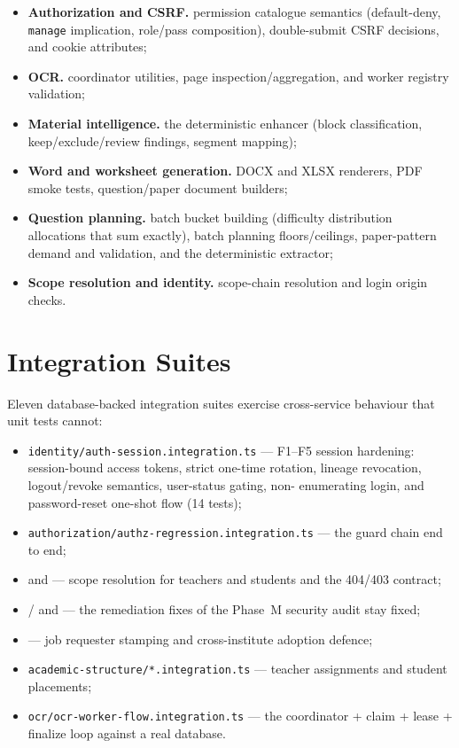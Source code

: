 \begin{itemize}
  \item \textbf{Authorization and CSRF.} permission catalogue semantics
  (default-deny, \texttt{manage} implication, role/pass composition),
  double-submit CSRF decisions, and cookie attributes;
  \item \textbf{OCR.} coordinator utilities, page inspection/aggregation, and
  worker registry validation;
  \item \begin{sloppypar}\textbf{Material intelligence.} the deterministic
  enhancer (block classification, keep/exclude/review findings, segment
  mapping);\end{sloppypar}
  \item \textbf{Word and worksheet generation.} DOCX and XLSX renderers, PDF
  smoke tests, question/paper document builders;
  \item \textbf{Question planning.} batch bucket building (difficulty
  distribution allocations that sum exactly), batch planning floors/ceilings,
  paper-pattern demand and validation, and the deterministic extractor;
  \item \textbf{Scope resolution and identity.} scope-chain resolution and
  login origin checks.
\end{itemize}

\section{Integration Suites}

\noindent Eleven database-backed integration suites exercise cross-service
behaviour that unit tests cannot:

\begin{itemize}
  \item \texttt{identity/auth-session.integration.ts} --- F1--F5 session
  hardening: session-bound access tokens, strict one-time rotation,
  lineage revocation, logout/revoke semantics, user-status gating, non-
  enumerating login, and password-reset one-shot flow (14 tests);
  \item \texttt{authorization/authz-regression.integration.ts} --- the guard
  chain end to end;
  \item \texttt{} and
  \texttt{} --- scope resolution for teachers and
  students and the 404/403 contract;
  \item \texttt{} /
  \texttt{}
  and \texttt{} --- the remediation fixes of
  the Phase~M security audit stay fixed;
  \item \texttt{} --- job requester
  stamping and cross-institute adoption defence;
  \item \texttt{academic-structure/*.integration.ts} --- teacher assignments
  and student placements;
  \item \texttt{ocr/ocr-worker-flow.integration.ts} --- the coordinator +
  claim + lease + finalize loop against a real database.
\end{itemize}

